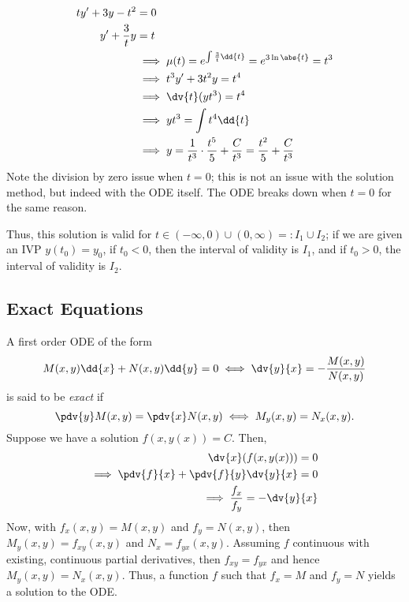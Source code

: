 \begin{example}
    \begin{align*}
        ty' + 3y - t^2 &= 0\\
        y' +  \frac{3}{t}y &= t\\
        &\implies \mu(t) = e^{\int \frac{3}{t} \dd{t}} = e^{3 \ln \abs{t}} = t^3\\
        &\implies t^3y'+ 3t^2y = t^4\\
        &\implies \dv{t}(yt^3) = t^4\\
        &\implies yt^3 = \int t^4 \dd{t}\\
        &\implies y = \frac{1}{t^3} \cdot \frac{t^5}{5} + \frac{C}{t^3} = \frac{t^2}{5} + \frac{C}{t^3}
    \end{align*}
    Note the division by zero issue when $t = 0$; this is not an issue with the solution method, but indeed with the ODE itself. The ODE breaks down when $t = 0$ for the same reason.

    Thus, this solution is valid for $t \in (-\infty, 0) \cup (0, \infty) =: I_1 \cup I_2$; if we are given an IVP $y(t_0) = y_0$, if $t_0 < 0$, then the interval of validity is $I_1$, and if $t_0 > 0$, the interval of validity is $I_2$.
\end{example}

\subsection{Exact Equations}

\begin{definition}
    A first order ODE of the form \[
    M(x, y) \dd{x} + N(x, y) \dd{y} = 0 \iff \dv{y}{x} = - \frac{M(x, y)}{N(x,y)}     
    \]
    is said to be \emph{exact} if $$\pdv{y} M(x, y) = \pdv{x} N(x, y) \iff M_y(x,y) = N_x(x, y).$$
    Suppose we have a solution $f(x, y(x)) = C$. Then, \begin{align*}
        \dv{x}(f(x, y(x))) = 0\\
        \implies \pdv{f}{x} + \pdv{f}{y}\dv{y}{x} = 0\\
        \implies \frac{f_x}{f_y} = -\dv{y}{x}
    \end{align*}
    Now, with $f_x(x,y) = M(x, y)$ and $f_y = N(x, y)$, then $M_y(x, y) = f_{xy}(x,y)$ and $N_x = f_{yx}(x,y)$. Assuming $f$ continuous with existing, continuous partial derivatives, then $f_{xy} = f_{yx}$ and hence $M_{y}(x, y) = N_x(x, y)$. Thus, a function $f$ such that $f_x = M$ and $f_y = N$ yields a solution to the ODE.
\end{definition}

